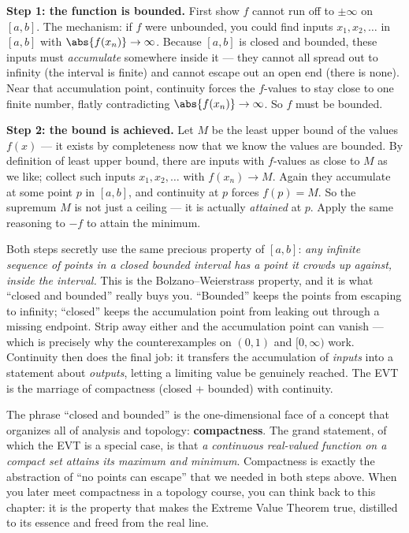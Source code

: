 \begin{intuitionbox}
\textbf{Step 1: the function is bounded.} First show $f$ cannot run off to $\pm\infty$ on
$[a,b]$. The mechanism: if $f$ were unbounded, you could find inputs $x_1,x_2,\dots$ in
$[a,b]$ with $\abs{f(x_n)}\to\infty$. Because $[a,b]$ is closed and bounded, these inputs
must \emph{accumulate} somewhere inside it --- they cannot all spread out to infinity (the
interval is finite) and cannot escape out an open end (there is none). Near that
accumulation point, continuity forces the $f$-values to stay close to one finite number,
flatly contradicting $\abs{f(x_n)}\to\infty$. So $f$ must be bounded.

\textbf{Step 2: the bound is achieved.} Let $M$ be the least upper bound of the values
$f(x)$ --- it exists by completeness now that we know the values are bounded. By definition
of least upper bound, there are inputs with $f$-values as close to $M$ as we like; collect
such inputs $x_1,x_2,\dots$ with $f(x_n)\to M$. Again they accumulate at some point $p$ in
$[a,b]$, and continuity at $p$ forces $f(p)=M$. So the supremum $M$ is not just a ceiling ---
it is actually \emph{attained} at $p$. Apply the same reasoning to $-f$ to attain the
minimum.
\end{intuitionbox}

\begin{happeningbox}
Both steps secretly use the same precious property of $[a,b]$: \emph{any infinite sequence
of points in a closed bounded interval has a point it crowds up against, inside the
interval.} This is the Bolzano--Weierstrass property, and it is what ``closed and bounded''
really buys you. ``Bounded'' keeps the points from escaping to infinity; ``closed'' keeps
the accumulation point from leaking out through a missing endpoint. Strip away either and
the accumulation point can vanish --- which is precisely why the counterexamples on $(0,1)$
and $[0,\infty)$ work. Continuity then does the final job: it transfers the accumulation of
\emph{inputs} into a statement about \emph{outputs}, letting a limiting value be genuinely
reached. The EVT is the marriage of compactness (closed + bounded) with continuity.
\end{happeningbox}

\begin{connectionbox}
The phrase ``closed and bounded'' is the one-dimensional face of a concept that organizes
all of analysis and topology: \textbf{compactness}. The grand statement, of which the EVT
is a special case, is that \emph{a continuous real-valued function on a compact set attains
its maximum and minimum}. Compactness is exactly the abstraction of ``no points can escape''
that we needed in both steps above. When you later meet compactness in a topology course,
you can think back to this chapter: it is the property that makes the Extreme Value Theorem
true, distilled to its essence and freed from the real line.
\end{connectionbox}

